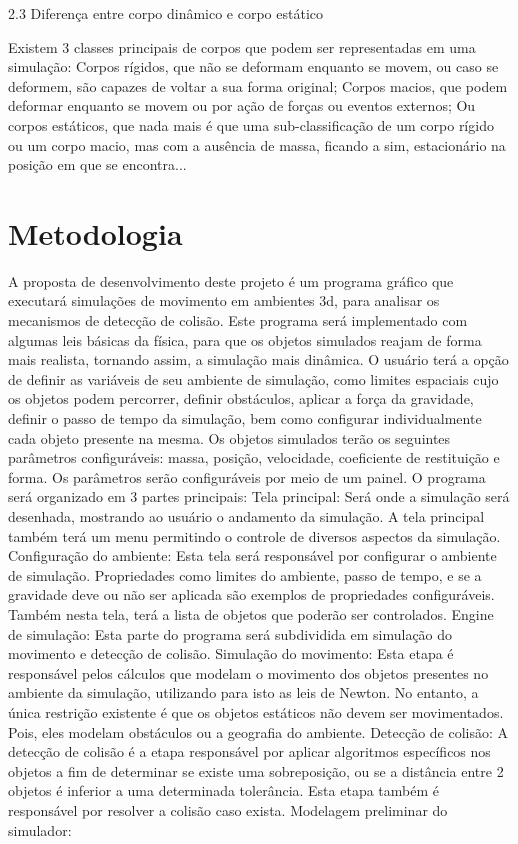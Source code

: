 2.3 Diferença entre corpo dinâmico e corpo estático

Existem 3 classes principais de corpos que podem ser representadas em uma simulação:
Corpos rígidos, que não se deformam  enquanto se movem, ou caso se deformem, são capazes de voltar a sua forma original;
Corpos macios, que podem deformar enquanto se movem ou por ação de forças ou eventos externos;
Ou corpos estáticos, que nada mais é que uma sub-classificação de um corpo rígido ou um corpo macio,  mas com a ausência de massa, ficando a sim, estacionário na posição em que se
encontra...



\section{Metodologia}

A  proposta de desenvolvimento deste projeto é um programa gráfico que
executará simulações de movimento em ambientes 3d, para analisar os mecanismos de detecção de colisão.
Este programa será implementado com algumas leis básicas da física, para que os objetos simulados reajam de forma mais realista,  tornando assim, a simulação mais dinâmica.
O usuário terá a opção de definir as variáveis de seu ambiente de simulação, como limites espaciais cujo os objetos podem percorrer, definir obstáculos, aplicar a força da gravidade,
definir o passo de tempo da simulação, bem como configurar individualmente cada
objeto presente na mesma.
Os objetos simulados terão os seguintes parâmetros configuráveis: massa,
posição, velocidade, coeficiente de restituição e forma. Os parâmetros serão configuráveis por meio de um painel.
O programa será organizado em 3 partes principais:
Tela principal:
Será onde a simulação será desenhada, mostrando ao usuário o andamento da simulação.
A tela principal também terá um menu permitindo o controle de diversos aspectos da simulação.
Configuração do ambiente:
Esta tela será responsável por configurar o ambiente de simulação. Propriedades
como limites do ambiente, passo de tempo, e se a gravidade deve ou não ser
aplicada são exemplos de propriedades configuráveis.
Também nesta tela, terá a lista de objetos que poderão ser controlados.
Engine de simulação:
Esta parte do programa será subdividida em simulação do movimento e detecção de colisão.
Simulação do movimento:
Esta etapa é responsável pelos cálculos que modelam o movimento dos objetos presentes no ambiente da simulação, utilizando para isto as leis de Newton.
No entanto, a  única restrição existente é que os objetos estáticos não devem ser movimentados. Pois, eles modelam obstáculos ou a geografia do ambiente.
Detecção de colisão:
A detecção de colisão é a etapa responsável por aplicar algoritmos específicos nos objetos a fim de determinar se existe uma sobreposição, ou se  a distância entre 2 objetos é inferior a uma determinada tolerância.
Esta etapa também é responsável por resolver a colisão caso exista.
Modelagem preliminar do simulador:

